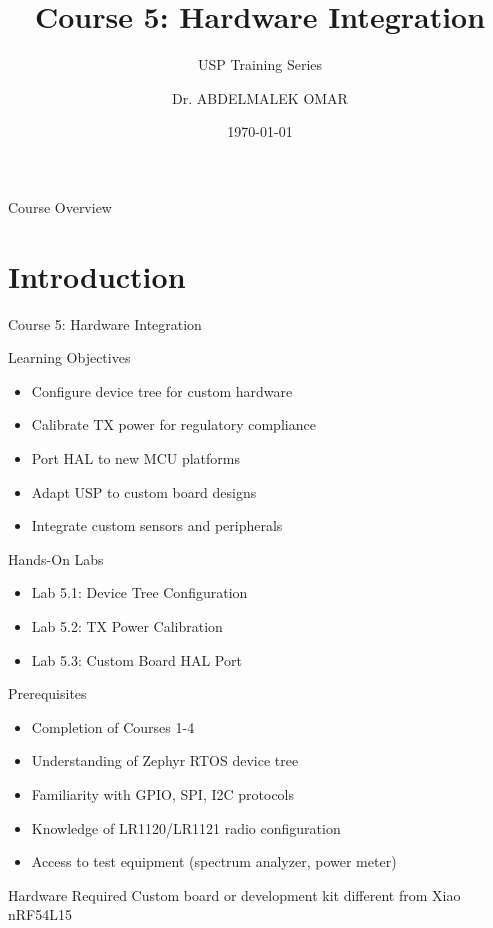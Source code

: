 \documentclass{beamer}
\title[USP Course 5: Hardware Integration]{Course 5: Hardware Integration}
\subtitle{USP Training Series}
\author{Dr. ABDELMALEK OMAR}
\institute{USP Zephyr Training Series\\Copyright \copyright{} 2025 Dr. ABDELMALEK OMAR}
\date{\today}
\begin{document}
\begin{frame}
\titlepage
\end{frame}

\begin{frame}{Course Overview}
\tableofcontents
\end{frame}

\section{Introduction}

\begin{frame}{Course 5: Hardware Integration}
\begin{block}{Learning Objectives}
\begin{itemize}
    \item Configure device tree for custom hardware
    \item Calibrate TX power for regulatory compliance
    \item Port HAL to new MCU platforms
    \item Adapt USP to custom board designs
    \item Integrate custom sensors and peripherals
\end{itemize}
\end{block}

\vspace{0.5cm}

\begin{block}{Hands-On Labs}
\begin{itemize}
    \item Lab 5.1: Device Tree Configuration
    \item Lab 5.2: TX Power Calibration
    \item Lab 5.3: Custom Board HAL Port
\end{itemize}
\end{block}
\end{frame}

\begin{frame}{Prerequisites}
\begin{itemize}
    \item Completion of Courses 1-4
    \item Understanding of Zephyr RTOS device tree
    \item Familiarity with GPIO, SPI, I2C protocols
    \item Knowledge of LR1120/LR1121 radio configuration
    \item Access to test equipment (spectrum analyzer, power meter)
\end{itemize}

\vspace{0.5cm}

\begin{alertblock}{Hardware Required}
Custom board or development kit different from Xiao nRF54L15
\end{alertblock}
\end{frame}
\end{document}
